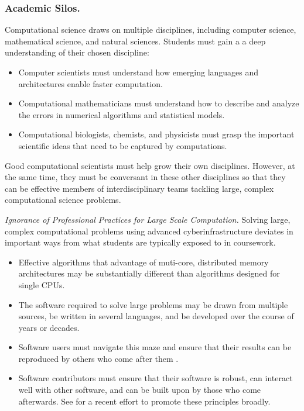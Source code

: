 \documentclass[11pt]{NSFamsart}
\begin{document}
\subsubsection*{Academic Silos.} Computational science draws on multiple disciplines, including computer science, mathematical science, and natural sciences.  Students must gain a a deep understanding of their chosen discipline:
\begin{itemize}
\item Computer scientists must understand how emerging languages and architectures enable faster computation.  

\item Computational mathematicians must understand how to describe and analyze the errors in numerical algorithms and statistical models.  

\item Computational biologists, chemists, and physicists must grasp the important scientific ideas that need to be captured by computations.  

\end{itemize}
Good computational scientists must help grow their own disciplines.  However, at the same time, they must be conversant in these other disciplines so that they can be effective members of  interdisciplinary teams tackling large, complex computational science problems.

\emph{Ignorance of Professional Practices for Large Scale Computation.}  Solving large, complex computational problems using advanced cyberinfrastructure deviates in important ways from what students are typically exposed to in coursework. 

\begin{itemize}

\item Effective algorithms that advantage of muti-core, distributed memory architectures may be substantially different than algorithms designed for single CPUs.

\item The software required to solve large problems may be drawn from multiple sources, be written in several languages, and be developed over the course of years or decades.


\item Software users must navigate this maze and ensure that their results can be reproduced by others who come after them \cite{Pen11}.  

\item Software contributors must ensure that their software is robust, can interact well with other software, and can be built upon by those who come afterwards.  See \cite{BSS18} for a recent effort to promote these principles broadly.

\end{itemize}
\end{document}

